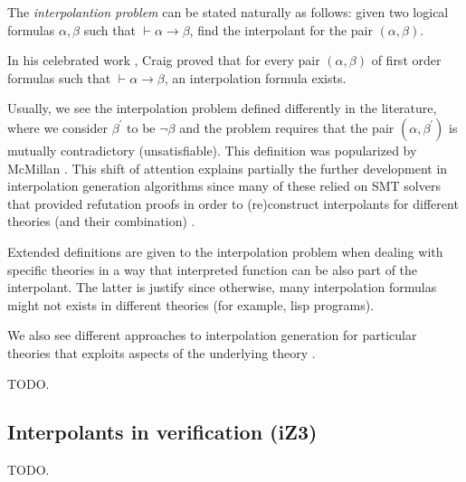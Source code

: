 The \emph{interpolantion problem} can be stated naturally as follows: given two
logical formulas $\alpha, \beta$ such that $\vdash \alpha \rightarrow \beta$, find
the interpolant for the pair $(\alpha, \beta)$.

In his celebrated work \cite{10.2307/2963594}, Craig proved that for every pair
$(\alpha, \beta)$ of first order formulas such that
$\vdash \alpha \rightarrow \beta$, an interpolation formula exists.

Usually, we see the interpolation problem defined differently in the literature, where
we consider $\beta^{'}$ to be $\neg \beta$ and the problem requires that the pair $(\alpha, \beta^{'})$
is mutually contradictory (unsatisfiable). This definition was popularized by McMillan
\cite{10.1007/978-3-540-24730-2_2}. This shift of attention explains partially the further
development in interpolation generation algorithms since many of these relied on
SMT solvers that provided refutation proofs in order to (re)construct interpolants
for different theories (and their combination) \cite{10.1007/978-3-642-02959-2_17,
  10.1007/978-3-642-36742-7_9, mcmillan2011interpolants}.

Extended definitions are given to the interpolation problem when dealing with specific
theories \cite{10.1007/11532231_26} in a way that interpreted function can be also part of
the interpolant. The latter is justify since otherwise, many interpolation formulas might
not exists in different theories (for example, lisp programs).

We also see different approaches to interpolation generation for particular
theories that exploits aspects of the underlying theory
\cite{10.1007/978-3-540-69738-1_25, 10.1007/11814771_21}.

TODO.

\subsection{Interpolants in verification (iZ3)}


TODO.

